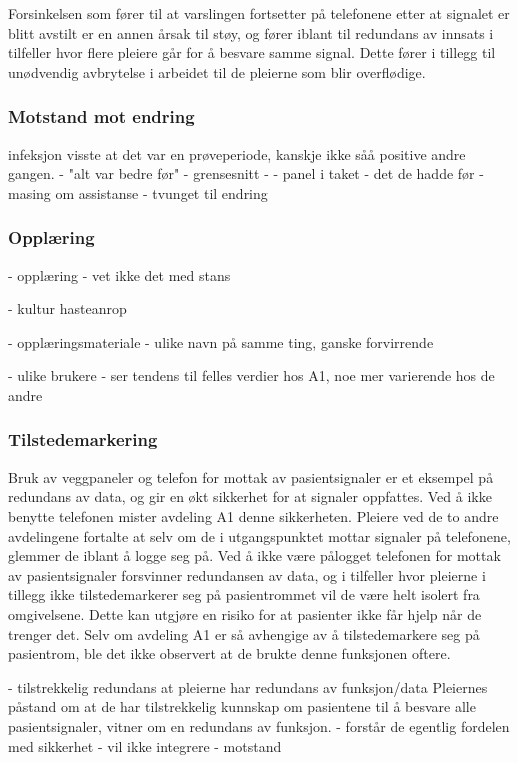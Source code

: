 \noindent
Forsinkelsen som fører til at varslingen fortsetter på telefonene etter at signalet er blitt avstilt er en annen årsak til støy, og fører iblant til redundans av innsats i tilfeller hvor flere pleiere går for å besvare samme signal. Dette fører i tillegg til unødvendig avbrytelse i arbeidet til de pleierne som blir overflødige. 

\subsubsection{Motstand mot endring}
	 infeksjon visste at det var en prøveperiode, kanskje ikke såå positive andre gangen.
	 	- "alt var bedre før"
	 	- grensesnitt
	 	- - panel i taket
		- det de hadde før
		- masing om assistanse
		- tvunget til endring

	 	

\subsubsection{Opplæring}	 	
- opplæring 
	- vet ikke det med stans
	
- kultur hasteanrop

- opplæringsmateriale - ulike navn på samme ting, ganske forvirrende

- ulike brukere
	- ser tendens til felles verdier hos A1, noe mer varierende hos de andre

\subsubsection{Tilstedemarkering}
Bruk av veggpaneler og telefon for mottak av pasientsignaler er et eksempel på redundans av data, og gir en økt sikkerhet for at signaler oppfattes. Ved å ikke benytte telefonen mister avdeling A1 denne sikkerheten. Pleiere ved de to andre avdelingene fortalte at selv om de i utgangspunktet mottar signaler på telefonene, glemmer de iblant å logge seg på. Ved å ikke være pålogget telefonen for mottak av pasientsignaler forsvinner redundansen av data, og i tilfeller hvor pleierne i tillegg ikke tilstedemarkerer seg på pasientrommet vil de være helt isolert fra omgivelsene. Dette kan utgjøre en risiko for at pasienter ikke får hjelp når de trenger det. Selv om avdeling A1 er så avhengige av å tilstedemarkere seg på pasientrom, ble det ikke observert at de brukte denne funksjonen oftere. 

- tilstrekkelig redundans at pleierne har redundans av funksjon/data
	Pleiernes påstand om at de har tilstrekkelig kunnskap om pasientene til å besvare alle pasientsignaler, vitner om en redundans av funksjon. 
- forstår de egentlig fordelen med sikkerhet
	- vil ikke integrere
	- motstand

